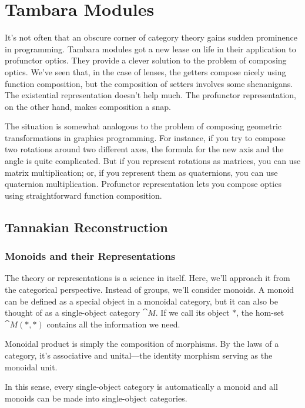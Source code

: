\documentclass[DaoFP]{subfiles}
\begin{document}
\setcounter{chapter}{17}

\chapter{Tambara Modules}

It's not often that an obscure corner of category theory gains sudden prominence in programming. Tambara modules got a new lease on life in their application to profunctor optics. They provide a clever solution to the problem of composing optics. We've seen that, in the case of lenses, the getters compose nicely using function composition, but the composition of setters involves some shenanigans. The existential representation doesn't help much. The profunctor representation, on the other hand, makes composition a snap. 

The situation is somewhat analogous to the problem of composing geometric transformations in graphics programming. For instance, if you try to compose two rotations around two different axes, the formula for the new axis and the angle is quite complicated. But if you represent rotations as matrices, you can use matrix multiplication; or, if you represent them as quaternions, you can use quaternion multiplication. Profunctor representation lets you compose optics using straightforward function composition.

\section{Tannakian Reconstruction}

\subsection{Monoids and their Representations}

The theory or representations is a science in itself. Here, we'll approach it from the categorical perspective. Instead of groups, we'll consider monoids. A monoid can be defined as a special object in a monoidal category, but it can also be thought of as a single-object category $\cat M$. If we call its object $*$, the hom-set $\cat M( *, *)$ contains all the information we need. 

Monoidal product is simply the composition of morphisms. By the laws of a category, it's associative and unital---the identity morphism serving as the monoidal unit.

In this sense, every single-object category is automatically a monoid and all monoids can be made into single-object categories. 
\end{document}
